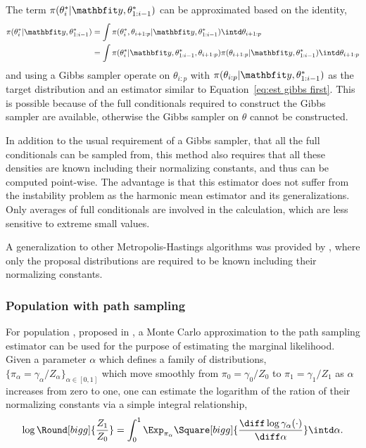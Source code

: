 The term $\pi(\theta_i^*|\data,\theta_{1:i-1}^*)$ can be approximated based on
the identity,
\begin{align}
  \pi(\theta_i^*|\data,\theta_{1:i-1}^*)
  &= \int \pi(\theta_i^*,\theta_{i+1:p}|\data,\theta_{1:i-1}^*)
  \intd\theta_{i+1:p} \notag\\
  &= \int \pi(\theta_i^*|\data,\theta_{1:i-1}^*,\theta_{i+1:p})
  \pi(\theta_{i+1:p}|\data,\theta_{1:i-1}^*) \intd\theta_{i+1:p}
\end{align}
and using a Gibbs sampler operate on $\theta_{i:p}$ with
$\pi(\theta_{i:p}|\data,\theta_{1:i-1}^*)$ as the target distribution and an
estimator similar to Equation~\eqref{eq:est gibbs first}. This is possible
because of the full conditionals required to construct the Gibbs sampler are
available, otherwise the Gibbs sampler on $\theta$ cannot be constructed.

In addition to the usual requirement of a Gibbs sampler, that all the full
conditionals can be sampled from, this method also requires that all these
densities are known including their normalizing constants, and thus can be
computed point-wise. The advantage is that this estimator does not suffer from
the instability problem as the harmonic mean estimator and its
generalizations. Only averages of full conditionals are involved in the
calculation, which are less sensitive to extreme small values.

A generalization to other Metropolis-Hastings algorithms was
provided by \cite{Chib:2001gq}, where only the proposal distributions are
required to be known including their normalizing constants.

\subsubsection{Population \mcmc with path sampling}
\label{ssub:Population mcmc with path sampling}

For population \mcmc, proposed in \cite{Calderhead:2009bd}, a Monte Carlo
approximation to the path sampling estimator \cite{Gelman:1998ei} can be used
for the purpose of estimating the marginal likelihood. Given a parameter
$\alpha$ which defines a family of distributions, $\{\pi_{\alpha} =
\gamma_{\alpha}/Z_{\alpha}\}_{\alpha\in[0,1]}$ which move smoothly from $\pi_0
= \gamma_0/Z_0$ to $\pi_1 = \gamma_1/Z_1$ as $\alpha$ increases from zero to
one, one can estimate the logarithm of the ration of their normalizing
constants via a simple integral relationship,
\begin{equation}
  \log\Round[bigg]{\frac{Z_1}{Z_0}} = \int_0^1\Exp_{\pi_{\alpha}}
  \Square[bigg]{\frac{\diff\log\gamma_{\alpha}(\cdot)}{\diff\alpha}}
  \intd\alpha.
  \label{eq:path integral}
\end{equation}

